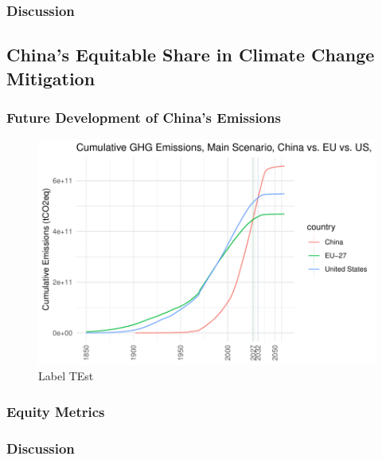 \documentclass[
  12pt,
]{article}
\numberwithin{equation}{section}
\numberwithin{table}{section}
\numberwithin{figure}{section}
\begin{document}
\hypertarget{discussion}{%
\subsubsection{Discussion}\label{discussion}}

\hypertarget{chinas-equitable-share-in-climate-change-mitigation}{%
\subsection{China's Equitable Share in Climate Change
Mitigation}\label{chinas-equitable-share-in-climate-change-mitigation}}

\hypertarget{future-development-of-chinas-emissions}{%
\subsubsection{Future Development of China's
Emissions}\label{future-development-of-chinas-emissions}}

\begin{figure}
\centering
\includegraphics{Paper_files/figure-latex/unnamed-chunk-1-1.pdf}
\caption{Label TEst}
\end{figure}

\hypertarget{equity-metrics}{%
\subsubsection{Equity Metrics}\label{equity-metrics}}

\hypertarget{discussion-1}{%
\subsubsection{Discussion}\label{discussion-1}}
\end{document}
